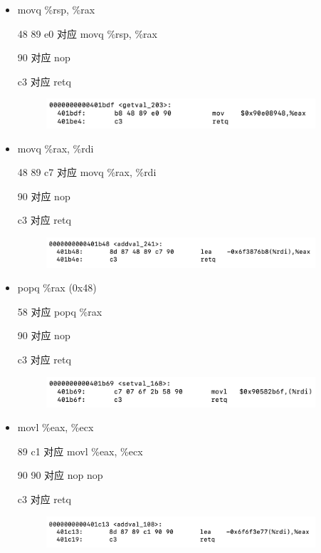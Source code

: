     \begin{itemize}
        \item movq \%rsp, \%rax
        \par 48 89 e0 对应 movq \%rsp, \%rax
        \par 90 对应 nop
        \par c3 对应 retq
        \begin{figure}[htbp]
            \centering
            \includegraphics*[width = 10cm]{rsp_rax.png}
        \end{figure}
        \item movq \%rax, \%rdi
        \par 48 89 c7 对应 movq \%rax, \%rdi
        \par 90 对应 nop
        \par c3 对应 retq
        \begin{figure}[htbp]
            \centering
            \includegraphics*[width = 10cm]{rax_rdi.png}
        \end{figure}
        \item popq \%rax (0x48)
        \par 58 对应 popq \%rax
        \par 90 对应 nop
        \par c3 对应 retq
        \begin{figure}[htbp]
            \centering
            \includegraphics*[width = 10cm]{pop_rax.png}
        \end{figure}
        \item movl \%eax, \%ecx
        \par 89 c1 对应 movl \%eax, \%ecx
        \par 90 90 对应 nop nop
        \par c3 对应 retq
        \begin{figure}[htbp]
            \centering
            \includegraphics*[width = 10cm]{eax_ecx.png}

\end{figure}
\end{itemize}
